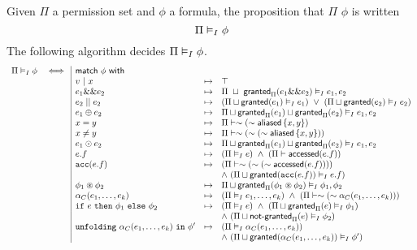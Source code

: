 Given $\Pi$ a permission set and $\phi$ a formula, the proposition that $\Pi$  $\phi$ is written
$$
\Pi \vDash_I \phi
$$
\noindent
The following algorithm decides $\Pi \vDash_I \phi$.
\begin{align*}
\begin{array}{rc|lrl}
\Pi \frames \phi & \iff & \tsf{match} \ \phi \ \tsf{with} && \\
%
%
&& v \ | \ x &\mt&
  \top
\\
&& e_1 \band e_2 &\mt&
  \Pi \ \merge \ \grantedPi(e_1 \band e_2) \frames e_1, e_2
\\
&& e_2 \bor e_2 &\mt&
  (\Pi \merge \granted(e_1) \frames e_1) \ \lor \
  (\Pi \merge \granted(e_2) \frames e_2)
\\
&& e_1 \oplus e_2 &\mt&
  \Pi \merge \grantedPi(e_1) \merge \grantedPi(e_2) \frames e_1, e_2
\\
&& x = y &\mt&
  \Pi \entails \pnot (\pnot \aliased\set{x,y})
\\
&& x \neq y &\mt&
  \Pi \entails \pnot (\pnot (\pnot \aliased\set{x,y}))
\\
&& e_1 \odot e_2 &\mt&
  \Pi \merge \grantedPi(e_1) \merge \grantedPi(e_2) \frames e_1, e_2
\\
&& e.f &\mt&
  (\Pi \frames e) \ \land \
  (\Pi \entails \accessed(e.f))
\\
&& \cacc(e.f) &\mt&
  (\Pi \entails \pnot (\pnot (\pnot \accessed(e.f)))) \\ &&&& \land \
  (\Pi \merge \granted(\cacc(e.f)) \frames e.f)
\\
&& \phi_1 \cast \phi_2 &\mt&
  \Pi \merge \grantedPi(\phi_1 \cast \phi_2) \frames
  \phi_1, \phi_2
\\
&& \alpha_C(e_1, \dots, e_k) &\mt&
  (\Pi \frames e_1, \dots, e_k) \ \land \
  (\Pi \entails \pnot (\pnot \alpha_C(e_1, \dots, e_k)))
\\
&& \cif \ e \ \cthen \ \phi_1 \ \celse \ \phi_2 &\mt&
  (\Pi \frames e) \ \land \
  (\Pi \merge \grantedPi(e) \frames \phi_1) \\ &&&& \land \
  (\Pi \merge \notgrantedPi(e) \frames \phi_2)
\\
&& \cunfolding \ \alpha_C(e_1, \dots, e_k) \ \cin \ \phi\p &\mt&
  (\Pi \frames \alpha_C(e_1, \dots, e_k)) \\ &&&& \land \
  (\Pi \merge \granted(\alpha_C(e_1, \dots, e_k)) \frames \phi\p)
\end{array}
\end{align*}

